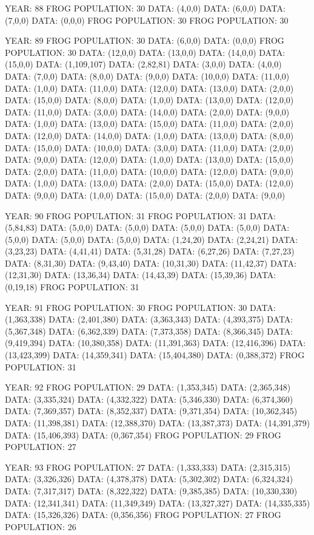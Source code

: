 \documentclass[12pt,a4paper]{article}
\begin{document}
{YEAR: 88
FROG POPULATION: 30
DATA: (4,0,0)
DATA: (6,0,0)
DATA: (7,0,0)
DATA: (0,0,0)
FROG POPULATION: 30
FROG POPULATION: 30

YEAR: 89
FROG POPULATION: 30
DATA: (6,0,0)
DATA: (0,0,0)
FROG POPULATION: 30
DATA: (12,0,0)
DATA: (13,0,0)
DATA: (14,0,0)
DATA: (15,0,0)
DATA: (1,109,107)
DATA: (2,82,81)
DATA: (3,0,0)
DATA: (4,0,0)
DATA: (7,0,0)
DATA: (8,0,0)
DATA: (9,0,0)
DATA: (10,0,0)
DATA: (11,0,0)
DATA: (1,0,0)
DATA: (11,0,0)
DATA: (12,0,0)
DATA: (13,0,0)
DATA: (2,0,0)
DATA: (15,0,0)
DATA: (8,0,0)
DATA: (1,0,0)
DATA: (13,0,0)
DATA: (12,0,0)
DATA: (11,0,0)
DATA: (3,0,0)
DATA: (14,0,0)
DATA: (2,0,0)
DATA: (9,0,0)
DATA: (1,0,0)
DATA: (13,0,0)
DATA: (15,0,0)
DATA: (11,0,0)
DATA: (2,0,0)
DATA: (12,0,0)
DATA: (14,0,0)
DATA: (1,0,0)
DATA: (13,0,0)
DATA: (8,0,0)
DATA: (15,0,0)
DATA: (10,0,0)
DATA: (3,0,0)
DATA: (11,0,0)
DATA: (2,0,0)
DATA: (9,0,0)
DATA: (12,0,0)
DATA: (1,0,0)
DATA: (13,0,0)
DATA: (15,0,0)
DATA: (2,0,0)
DATA: (11,0,0)
DATA: (10,0,0)
DATA: (12,0,0)
DATA: (9,0,0)
DATA: (1,0,0)
DATA: (13,0,0)
DATA: (2,0,0)
DATA: (15,0,0)
DATA: (12,0,0)
DATA: (9,0,0)
DATA: (1,0,0)
DATA: (15,0,0)
DATA: (2,0,0)
DATA: (9,0,0)

YEAR: 90
FROG POPULATION: 31
FROG POPULATION: 31
DATA: (5,84,83)
DATA: (5,0,0)
DATA: (5,0,0)
DATA: (5,0,0)
DATA: (5,0,0)
DATA: (5,0,0)
DATA: (5,0,0)
DATA: (5,0,0)
DATA: (1,24,20)
DATA: (2,24,21)
DATA: (3,23,23)
DATA: (4,41,41)
DATA: (5,31,28)
DATA: (6,27,26)
DATA: (7,27,23)
DATA: (8,31,30)
DATA: (9,43,40)
DATA: (10,31,30)
DATA: (11,42,37)
DATA: (12,31,30)
DATA: (13,36,34)
DATA: (14,43,39)
DATA: (15,39,36)
DATA: (0,19,18)
FROG POPULATION: 31

YEAR: 91
FROG POPULATION: 30
FROG POPULATION: 30
DATA: (1,363,338)
DATA: (2,401,380)
DATA: (3,363,343)
DATA: (4,393,375)
DATA: (5,367,348)
DATA: (6,362,339)
DATA: (7,373,358)
DATA: (8,366,345)
DATA: (9,419,394)
DATA: (10,380,358)
DATA: (11,391,363)
DATA: (12,416,396)
DATA: (13,423,399)
DATA: (14,359,341)
DATA: (15,404,380)
DATA: (0,388,372)
FROG POPULATION: 31

YEAR: 92
FROG POPULATION: 29
DATA: (1,353,345)
DATA: (2,365,348)
DATA: (3,335,324)
DATA: (4,332,322)
DATA: (5,346,330)
DATA: (6,374,360)
DATA: (7,369,357)
DATA: (8,352,337)
DATA: (9,371,354)
DATA: (10,362,345)
DATA: (11,398,381)
DATA: (12,388,370)
DATA: (13,387,373)
DATA: (14,391,379)
DATA: (15,406,393)
DATA: (0,367,354)
FROG POPULATION: 29
FROG POPULATION: 27

YEAR: 93
FROG POPULATION: 27
DATA: (1,333,333)
DATA: (2,315,315)
DATA: (3,326,326)
DATA: (4,378,378)
DATA: (5,302,302)
DATA: (6,324,324)
DATA: (7,317,317)
DATA: (8,322,322)
DATA: (9,385,385)
DATA: (10,330,330)
DATA: (12,341,341)
DATA: (11,349,349)
DATA: (13,327,327)
DATA: (14,335,335)
DATA: (15,326,326)
DATA: (0,356,356)
FROG POPULATION: 27
FROG POPULATION: 26

}
\end{document}
